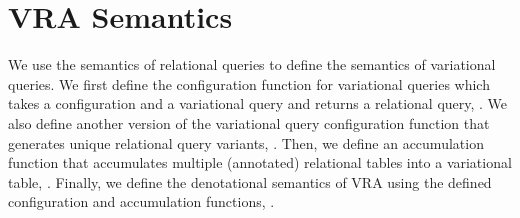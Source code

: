 \section{VRA Semantics }
\label{sec:vrasem}


We use the semantics of relational queries to define the semantics of 
variational queries. We first define the configuration function
for variational queries which takes a configuration and a variational query
and returns a relational query, . We also define another version of the
variational query configuration function that generates unique relational
query variants, . Then, we define an accumulation function that accumulates
multiple (annotated) relational tables into a variational table, . Finally, we  
define the denotational semantics of VRA using the defined configuration and
accumulation functions, .
%


